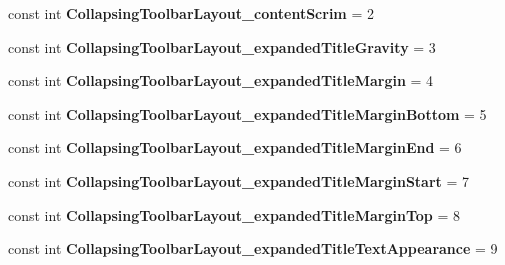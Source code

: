 \begin{DoxyCompactItemize}
\item 
\mbox{\label{classst_delivery_1_1_resource_1_1_styleable_a5f587b692e30fb60c764b1b707457ac3}} 
const int {\bfseries Collapsing\+Toolbar\+Layout\+\_\+content\+Scrim} = 2
\item 
\mbox{\label{classst_delivery_1_1_resource_1_1_styleable_a9d3b40f32a6d0df00ebcdc4ff78ee1dd}} 
const int {\bfseries Collapsing\+Toolbar\+Layout\+\_\+expanded\+Title\+Gravity} = 3
\item 
\mbox{\label{classst_delivery_1_1_resource_1_1_styleable_a3b067ac36b1229044d4a2904e0b516a9}} 
const int {\bfseries Collapsing\+Toolbar\+Layout\+\_\+expanded\+Title\+Margin} = 4
\item 
\mbox{\label{classst_delivery_1_1_resource_1_1_styleable_ada40a1e4d294eb44c12e40e61e17534c}} 
const int {\bfseries Collapsing\+Toolbar\+Layout\+\_\+expanded\+Title\+Margin\+Bottom} = 5
\item 
\mbox{\label{classst_delivery_1_1_resource_1_1_styleable_acb91225d60a0f14d7845009541202986}} 
const int {\bfseries Collapsing\+Toolbar\+Layout\+\_\+expanded\+Title\+Margin\+End} = 6
\item 
\mbox{\label{classst_delivery_1_1_resource_1_1_styleable_aab47305e2e2a7fa59c2d46843238e611}} 
const int {\bfseries Collapsing\+Toolbar\+Layout\+\_\+expanded\+Title\+Margin\+Start} = 7
\item 
\mbox{\label{classst_delivery_1_1_resource_1_1_styleable_af47de0ac64a64ee8a504d97cf9d6c8e5}} 
const int {\bfseries Collapsing\+Toolbar\+Layout\+\_\+expanded\+Title\+Margin\+Top} = 8
\item 
\mbox{\label{classst_delivery_1_1_resource_1_1_styleable_ad88e737c4c87d0e9b9fbacf6861d3197}} 
const int {\bfseries Collapsing\+Toolbar\+Layout\+\_\+expanded\+Title\+Text\+Appearance} = 9
\item 
\mbox{\label{classst_delivery_1_1_resource_1_1_styleable_a29963098c792223c9596a3c4cabcda10}} 

\end{DoxyCompactItemize}
